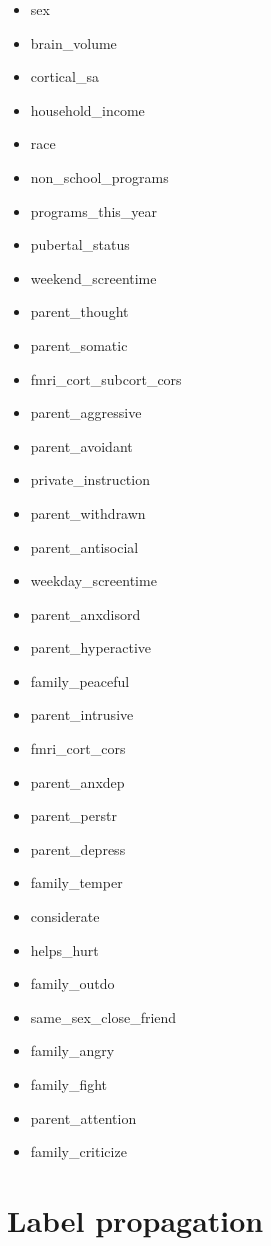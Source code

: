 \documentclass[
  letterpaper,
  DIV=11,
  numbers=noendperiod]{scrreprt}
\providecommand{\tightlist}{%
  \setlength{\itemsep}{0pt}\setlength{\parskip}{0pt}}\usepackage{longtable,booktabs,array}
\begin{document}
\begin{itemize}
\tightlist
\item
  sex
\item
  brain\_volume
\item
  cortical\_sa
\item
  household\_income
\item
  race
\item
  non\_school\_programs
\item
  programs\_this\_year
\item
  pubertal\_status
\item
  weekend\_screentime
\item
  parent\_thought
\item
  parent\_somatic
\item
  fmri\_cort\_subcort\_cors
\item
  parent\_aggressive
\item
  parent\_avoidant
\item
  private\_instruction
\item
  parent\_withdrawn
\item
  parent\_antisocial
\item
  weekday\_screentime
\item
  parent\_anxdisord
\item
  parent\_hyperactive
\item
  family\_peaceful
\item
  parent\_intrusive
\item
  fmri\_cort\_cors
\item
  parent\_anxdep
\item
  parent\_perstr
\item
  parent\_depress
\item
  family\_temper
\item
  considerate
\item
  helps\_hurt
\item
  family\_outdo
\item
  same\_sex\_close\_friend
\item
  family\_angry
\item
  family\_fight
\item
  parent\_attention
\item
  family\_criticize
\end{itemize}

\chapter{Label propagation}\label{label-propagation}
\end{document}
